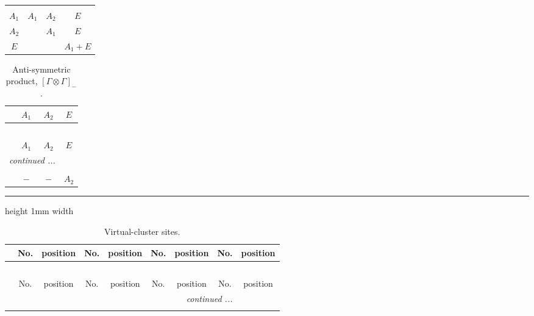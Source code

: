\documentclass[fleqn,10pt,landscape]{article}
\begin{document}
\begin{itemize}
\begin{center}
\begin{longtable}{c|ccc}
 \hline \hline
\multicolumn{3}{r}{} \\ \endlastfoot

$ A_{1} $ & $ A_{1} $ & $ A_{2} $ & $ E $ \\
$ A_{2} $ & $  $ & $ A_{1} $ & $ E $ \\
$ E $ & $  $ & $  $ & $ A_{1} + E $ \\
\end{longtable}
\end{center}
\begin{center}
\renewcommand{\arraystretch}{1.0}
\begin{longtable}{cccc}
\caption{Anti-symmetric product, $[\Gamma\otimes\Gamma]_-$.}
 \\
 \hline \hline
 & $ A_{1} $ & $ A_{2} $ & $ E $ \\ \hline \endfirsthead

\multicolumn{3}{l}{\tablename\ \thetable{}} \\
 \hline \hline
 & $ A_{1} $ & $ A_{2} $ & $ E $ \\ \hline \endhead

 \hline \hline
\multicolumn{3}{r}{\footnotesize\it continued ...} \\ \endfoot

 \hline \hline
\multicolumn{3}{r}{} \\ \endlastfoot

$  $ & $ - $ & $ - $ & $ A_{2} $ \\
\end{longtable}
\end{center}

 \hfil \hrule height 1mm width \textwidth \hfil

{
\scriptsize
\begin{center}
\renewcommand{\arraystretch}{1.7}
\begin{longtable}{ccccccccc}
\caption{Virtual-cluster sites.}
 \\
 \hline \hline
 & No. & position & No. & position & No. & position & No. & position \\ \hline \endfirsthead

\multicolumn{8}{l}{\tablename\ \thetable{}} \\
 \hline \hline
 & No. & position & No. & position & No. & position & No. & position \\ \hline \endhead

 \hline \hline
\multicolumn{8}{r}{\footnotesize\it continued ...} \\ \endfoot


\end{longtable}
\end{center}}
\end{itemize}
\end{document}
